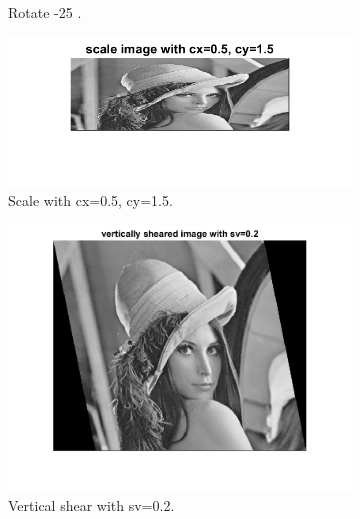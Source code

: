 \documentclass[14pt]{article}
\begin{document}
\begin{figure}[hbt!]
\begin{subfigure}[b]{0.23\linewidth}
			\caption{Rotate -25 \degree.}
		\end{subfigure}
		\begin{subfigure}[b]{0.23\linewidth}
			\includegraphics[width=\linewidth]{scale.png}
			\caption{Scale with cx=0.5, cy=1.5.}
		\end{subfigure}
		\begin{subfigure}[b]{0.23\linewidth}
			\includegraphics[width=\linewidth]{Vshear.png}
			\caption{Vertical shear with sv=0.2.}
		\end{subfigure}
		\begin{subfigure}[b]{0.23\linewidth}

\end{subfigure}
\end{figure}
\end{document}
